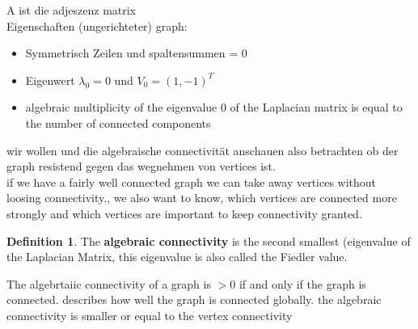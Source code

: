 \documentclass[a4paper]{article}
\theoremstyle{definition}
\newtheorem*{definition}{Definition}
\theoremstyle{remark}
\begin{document}
 
A ist die adjeszenz matrix\\
Eigenschaften (ungerichteter) graph:
	\begin{itemize}
  \item Symmetrisch Zeilen und spaltensummen = 0
	\item Eigenwert $\lambda_0=0$ und  $V_0=(1,-1)^T$
	\item algebraic multiplicity of the eigenvalue 0 of the Laplacian matrix is equal to the number of connected components
	\end{itemize}
  wir wollen und die algebraische connectivität anschauen also betrachten ob der graph resistend gegen das wegnehmen von vertices ist.\\
  if we have a fairly well connected graph we can take away vertices without loosing connectivity., we also want to know, which vertices are connected more strongly and which vertices are important to keep connectivity granted.\\
\begin{definition}
	The \textbf{algebraic connectivity} is the second smallest (eigenvalue of the Laplacian Matrix, this eigenvalue is also called the Fiedler value.\\
\end{definition}
	The algebrtaiic connectivity of a graph is  $> 0$ if and only if the graph is connected.
  describes how well the graph is connected globally.
the algebraic connectivity is smaller or equal to the  vertex connectivity
\end{document}
